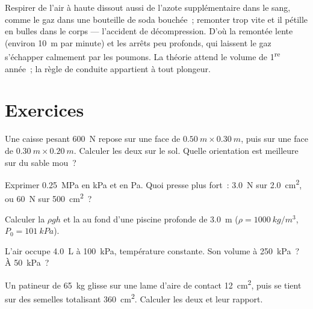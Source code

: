 \begin{remark}[Décompression]\label{rem:g10:pressure:deco}
Respirer de l'air à haute  dissout aussi de l'azote
supplémentaire dans le sang, comme le gaz dans une bouteille de soda
bouchée~; remonter trop vite et il pétille en bulles dans le corps ---
l'accident de décompression. D'où la remontée lente (environ
\qty{10}{m} par minute) et les arrêts peu profonds, qui laissent le gaz
s'échapper calmement par les poumons. La théorie attend le volume de
1\textsuperscript{re} année~; la règle de conduite appartient à tout
plongeur.
\end{remark}

\section{Exercices}

\begin{exercise}[$\star$]\label{exo:g10:pressure:1}
Une caisse pesant \qty{600}{N} repose sur une face de
$\qty{0.50}{m} \times \qty{0.30}{m}$, puis sur une face de
$\qty{0.30}{m} \times \qty{0.20}{m}$. Calculer les deux
 sur le sol. Quelle orientation est meilleure
sur du sable mou~?
\end{exercise}

\begin{exercise}[$\star$]\label{exo:g10:pressure:2}
Exprimer \qty{0.25}{MPa} en \unit{kPa} et en \unit{Pa}. Quoi presse plus
fort~: \qty{3.0}{N} sur \qty{2.0}{cm^2}, ou \qty{60}{N} sur
\qty{500}{cm^2}~?
\end{exercise}

\begin{exercise}[$\star$]\label{exo:g10:pressure:3}
Calculer la  $\rho g h$ et la
 au fond d'une piscine profonde de
\qty{3.0}{m} ($\rho = \qty{1000}{kg/m^3}$, $P_0 = \qty{101}{kPa}$).
\end{exercise}

\begin{exercise}[$\star$]\label{exo:g10:pressure:4}
L'air occupe \qty{4.0}{L} à \qty{100}{kPa}, température constante. Son
volume à \qty{250}{kPa}~? À \qty{50}{kPa}~?
\end{exercise}

\begin{exercise}[$\star$]\label{exo:g10:pressure:5}
Un patineur de \qty{65}{kg} glisse sur une lame d'aire de contact
\qty{12}{cm^2}, puis se tient sur des semelles totalisant
\qty{360}{cm^2}. Calculer les deux  et leur
rapport.
\end{exercise}

